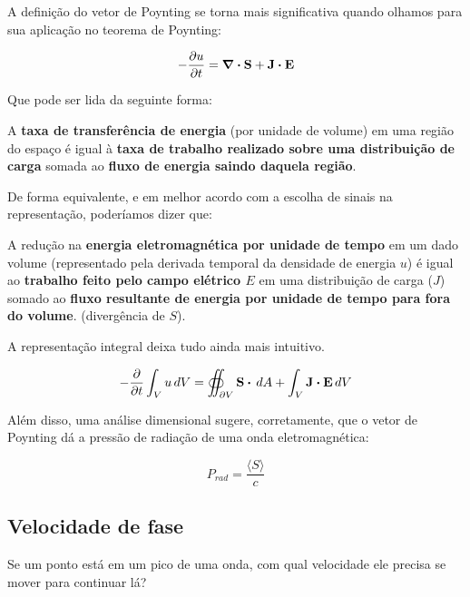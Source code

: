 \documentclass[12pt,a4paper]{report}
\begin{document}
A definição do vetor de Poynting se torna mais significativa quando olhamos para sua aplicação no teorema de Poynting:

\begin{equation}
    -\frac{\partial u}{\partial t}=\div{\textbf{S}}+\textbf{J}\vdot\textbf{E}
\end{equation}

Que pode ser lida da seguinte forma:

\begin{displayquote}
    A \textbf{taxa de transferência de energia} (por unidade de volume) em uma região do espaço é igual à \textbf{taxa de trabalho realizado sobre uma distribuição de carga} somada ao \textbf{fluxo de energia saindo daquela região}.
\end{displayquote}

De forma equivalente, e em melhor acordo com a escolha de sinais na representação, poderíamos dizer que:

\begin{displayquote}
    A redução na \textbf{energia eletromagnética por unidade de tempo} em um dado volume (representado pela derivada temporal da densidade de energia $u$) é igual ao \textbf{trabalho feito pelo campo elétrico \textbf{$E$}} em uma distribuição de carga (\textbf{$J$}) somado ao \textbf{fluxo resultante de energia por unidade de tempo para fora do volume}. (divergência de \textbf{$S$}).
\end{displayquote}

A representação integral deixa tudo ainda mais intuitivo.

\begin{equation}
    -\frac{\partial}{\partial t}\int_V u \,dV= \oiint_{\partial V} \textbf{S}\vdot\,dA+\int_V \textbf{J}\vdot\textbf{E}\,dV
\end{equation}

Além disso, uma análise dimensional sugere, corretamente, que o vetor de Poynting dá a pressão de radiação de uma onda eletromagnética:

\begin{equation}
    P_{rad}=\frac{\langle S \rangle}{c}
\end{equation}

\subsection{Velocidade de fase}

Se um ponto está em um pico de uma onda, com qual velocidade ele precisa se mover para continuar lá?
\end{document}
